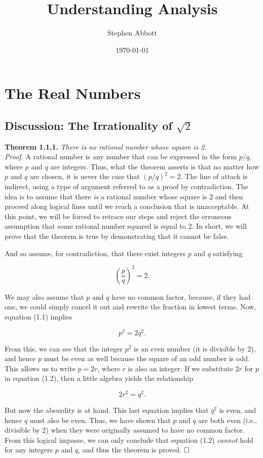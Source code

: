 \documentclass{report}
\title{Understanding Analysis}
\author{Stephen Abbott}
\date{\today}
\begin{document}

\maketitle

\tableofcontents

\chapter{The Real Numbers}

\section{Discussion: The Irrationality of $\sqrt{2}$}

\textbf{Theorem 1.1.1.} \emph{There is no rational number whose square is 2.}
\\
\emph{Proof.} A rational number is any number that can be expressed in the form $p/q$, where $p$ and $q$ are integers. Thus, what the theorem asserts is that no matter how $p$ and $q$ are chosen, it is never the case that $(p/q)^2 = 2$. The line of attack is indirect, using a type of argument referred to as a proof by contradiction. The idea is to assume that there \emph{is} a rational number whose square is 2 and then proceed along logical lines until we reach a conclusion that is unacceptable. At this point, we will be forced to retrace our steps and reject the erroneous assumption that some rational number squared is equal to 2. In short, we will prove that the theorem is true by demonstrating that it cannot be false.

And so assume, for contradiction, that there exist integers $p$ and $q$ satisfying

\begin{equation}\label{1.1}
\left(\frac{p}{q}\right)^2 = 2.
\end{equation}

We may also assume that $p$ and $q$ have no common factor, because, if they had one, we could simply cancel it out and rewrite the fraction in lowest terms. Now, equation (1.1) implies

\begin{equation}\label{eq:2}
p^2 = 2q^2.
\end{equation}

From this, we can see that the integer $p^2$ is an even number (it is divisible by 2), and hence $p$ must be even as well because the square of an odd number is odd. This allows us to write $p = 2r$, where $r$ is also an integer. If we substitute $2r$ for $p$ in equation (1.2), then a little algebra yields the relationship

$$2r^2 = q^2.$$

But now the absurdity is at hand. This last equation implies that $q^2$ is even, and hence $q$ must also be even. Thus, we have shown that $p$ and $q$ are both even (i.e., divisible by 2) when they were originally assumed to have no common factor. From this logical impasse, we can only conclude that equation (1.2) \emph{cannot} hold for any integers $p$ and $q$, and thus the theorem is proved. $\hfill\square$
\end{document}
